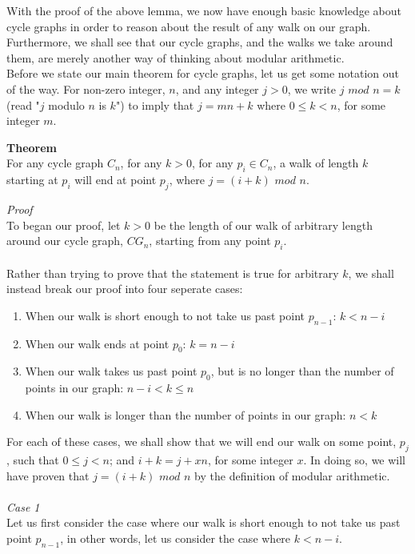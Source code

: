 \documentclass[a4paper,12pt]{article}
\begin{document}
With the proof of the above lemma, we now have enough basic knowledge about cycle graphs in order to reason about the result of any walk on our graph. Furthermore, we shall see that our cycle graphs, and the walks we take around them, are merely another way of thinking about modular arithmetic.\\

Before we state our main theorem for cycle graphs, let us get some notation out of the way. For non-zero integer, $n$, and any integer $j > 0$, we write $j$ $mod$ $n = k$ (read "$j$ modulo $n$ is $k$") to imply that $j = mn + k$ where $0 \leq k < n$, for some integer $m$.\\
\begin{tcolorbox}
\textbf{Theorem}\\
For any cycle graph $C_n$, for any $k > 0$, for any $p_i \in C_n$, a walk of length $k$ starting at $p_i$ will end at point $p_j$, where $j = (i + k)$ $mod$ $n$.\\
\end{tcolorbox}
\noindent
\textit{Proof}\\
To began our proof, let $k > 0$ be the length of our walk of arbitrary length around our cycle graph, $CG_n$, starting from any point $p_i$.\\
\\
Rather than trying to prove that the statement is true for arbitrary $k$, we shall instead break our proof into four seperate cases:
\begin{enumerate}
\item When our walk is short enough to not take us past point $p_{n-1}$: $k < n -i$
\item When our walk ends at point $p_0$: $k = n - i$
\item When our walk takes us past point $p_0$, but is no longer than the number of points in our graph: $n - i < k \leq n$
\item When our walk is longer than the number of points in our graph: $n < k$
\end{enumerate}
For each of these cases, we shall show that we will end our walk on some point, $p_j$, such that $0 \leq j < n$; and $i + k = j + xn$, for some integer $x$. In doing so, we will have proven that $j = (i +k)$ $mod$ $n$ by the definition of modular arithmetic.\\
\\ 
\textit{Case 1}\\
Let us first consider the case where our walk is short enough to not take us past point $p_{n-1}$, in other words, let us consider the case where $k < n - i$.\\
\end{document}
